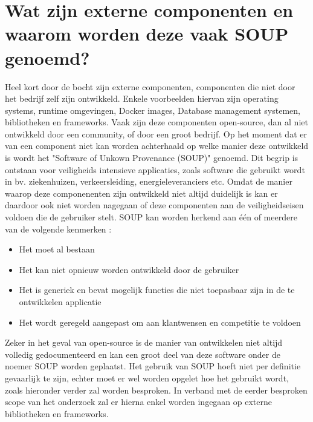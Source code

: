 \section{Wat zijn externe componenten en waarom worden deze vaak SOUP genoemd?}\label{sec:watisSOUP}
Heel kort door de bocht zijn externe componenten, componenten die niet door het bedrijf zelf zijn ontwikkeld. Enkele voorbeelden hiervan zijn operating systems, runtime omgevingen, Docker images, Database management systemen, bibliotheken en frameworks. Vaak zijn deze componenten open-source, dan al niet ontwikkeld door een community, of door een groot bedrijf. Op het moment dat er van een component niet kan worden achterhaald op welke manier deze ontwikkeld is wordt het "Software of Unkown Provenance (SOUP)" genoemd. Dit begrip is ontstaan voor veiligheids intensieve applicaties, zoals software die gebruikt wordt in bv. ziekenhuizen, verkeersleiding, energieleveranciers etc. Omdat de manier waarop deze componenenten zijn ontwikkeld niet altijd duidelijk is kan er daardoor ook niet worden nagegaan of deze componenten aan de veiligheidseisen voldoen die de gebruiker stelt. SOUP kan worden herkend aan één of meerdere van de volgende kenmerken \citep{Bischop:2001}:
\begin{itemize}
    \item Het moet al bestaan
    \item Het kan niet opnieuw worden ontwikkeld door de gebruiker
    \item Het is generiek en bevat mogelijk functies die niet toepasbaar zijn in de te ontwikkelen applicatie
    \item Het wordt geregeld aangepast om aan klantwensen en competitie te voldoen
\end{itemize}

Zeker in het geval van open-source is de manier van ontwikkelen niet altijd volledig gedocumenteerd en kan een groot deel van deze software onder de noemer SOUP worden geplaatst. Het gebruik van SOUP hoeft niet per definitie gevaarlijk te zijn, echter moet er wel worden opgelet hoe het gebruikt wordt, zoals hieronder verder zal worden besproken. In verband met de eerder besproken scope van het onderzoek zal er hierna enkel worden ingegaan op externe bibliotheken en frameworks.

